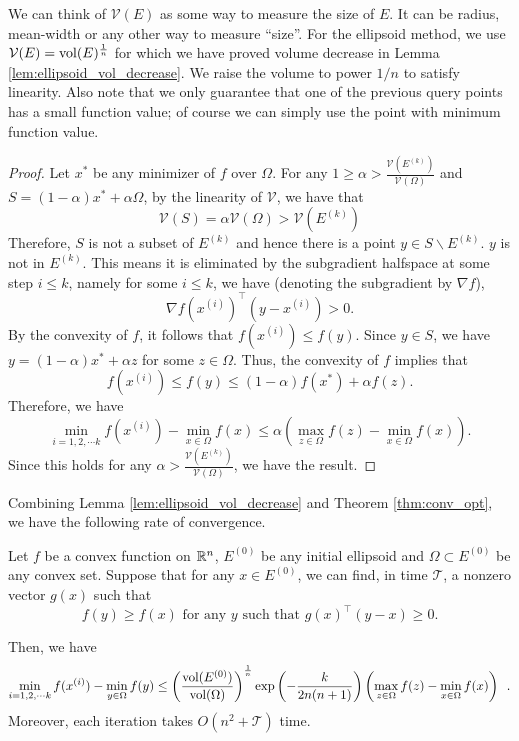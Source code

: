 \begin{rem}
We can think of $\mathcal{V}(E)$ as some way to measure the size
of $E$. It can be radius, mean-width or any other way to measure
``size''. For the ellipsoid method, we use $\mathcal{V}(E)=\mathrm{vol}(E)^{\frac{1}{n}}$
for which we have proved volume decrease in Lemma \ref{lem:ellipsoid_vol_decrease}.
We raise the volume to power $1/n$ to satisfy linearity. Also note
that we only guarantee that one of the previous query points has a
small function value; of course we can simply use the point with minimum
function value.
\end{rem}

\begin{proof}
Let $x^{*}$ be any minimizer of $f$ over $\Omega$. For any $1\ge\alpha>\frac{\mathcal{V}(E^{(k)})}{\mathcal{V}(\Omega)}$
and $S=(1-\alpha)x^{*}+\alpha\Omega$, by the linearity of $\mathcal{V}$,
we have that 
\[
\mathcal{V}(S)=\alpha\mathcal{V}(\Omega)>\mathcal{V}(E^{(k)})
\]
Therefore, $S$ is not a subset of $E^{(k)}$ and hence there is a
point $y\in S\backslash E^{(k)}$. $y$ is not in $E^{(k)}$. This
means it is eliminated by the subgradient halfspace at some step $i\leq k$,
namely for some $i\le k$, we have (denoting the subgradient by $\nabla f$),
\[
\nabla f(x^{(i)})^{\top}(y-x^{(i)})>0.
\]
By the convexity of $f$, it follows that $f(x^{(i)})\leq f(y).$
Since $y\in S$, we have $y=(1-\alpha)x^{*}+\alpha z$ for some $z\in\Omega$.
Thus, the convexity of $f$ implies that
\[
f(x^{(i)})\leq f(y)\leq(1-\alpha)f(x^{*})+\alpha f(z).
\]
Therefore, we have
\[
\min_{i=1,2,\cdots k}f(x^{(i)})-\min_{x\in\Omega}f(x)\leq\alpha\left(\max_{z\in\Omega}f(z)-\min_{x\in\Omega}f(x)\right).
\]
Since this holds for any $\alpha>\frac{\mathcal{V}(E^{(k)})}{\mathcal{V}(\Omega)}$,
we have the result.
\end{proof}
Combining Lemma \ref{lem:ellipsoid_vol_decrease} and Theorem \ref{thm:conv_opt},
we have the following rate of convergence.
\begin{thm}
\label{thm:ellipsoid}Let $f$ be a convex function on $\mathbb{R}^{n}$, $E^{(0)}$
be any initial ellipsoid and $\Omega\subset E^{(0)}$ be any convex
set. Suppose that for any $x\in E^{(0)}$, we can find, in time $\mathcal{T}$,
a nonzero vector $g(x)$ such that 
\[
f(y)\geq f(x)\text{ for any }y\text{ such that }g(x)^{\top}(y-x)\geq0.
\]

Then, we have
\[
\min_{i=1,2,\cdots k}f(x^{(i)})-\min_{y\in\Omega}f(y)\leq\left(\frac{\mathrm{vol}(E^{(0)})}{\mathrm{vol}(\Omega)}\right)^{\frac{1}{n}}\exp\left(-\frac{k}{2n(n+1)}\right)\left(\max_{z\in\Omega}f(z)-\min_{x\in\Omega}f(x)\right)\enspace.
\]
Moreover, each iteration takes $O(n^{2}+\mathcal{T})$ time.
\end{thm}


